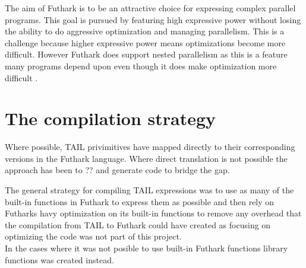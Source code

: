 \documentclass[11pt]{article}
\begin{document}
The aim of Futhark is to be an attractive choice for expressing complex parallel programs.
This goal is pursued by featuring high expressive power without
losing the ability to do aggressive optimization and managing parallelism.
This is a challenge because higher expressive power means optimizations become more difficult. 
However Futhark does support nested parallelism as this is a feature many programs 
depend upon even though it does make optimization more difficult \cite{TroelsHenriksen}.




\section{The compilation strategy}
Where possible, TAIL privimitives have mapped directly to their corresponding versions in the Futhark language.
Where direct translation is not possible the approach has been to ?? and generate code to bridge the gap.



The general strategy for compiling TAIL expressions
was to use as many of the built-in functions in Futhark to express them as possible
and then rely on Futharks havy optimization on its built-in functions to remove any overhead that the compilation from TAIL to Futhark could have created
as focusing on optimizing the code was not part of this project. \\

In the cases where it was not posible to use built-in Futhark functions library functions was created instead. 
\end{document}

